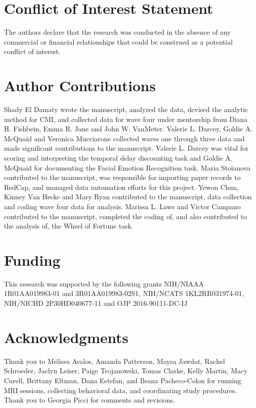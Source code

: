 \documentclass{article}%
\begin{document}
\section*{Conflict of Interest Statement}
The authors declare that the research was conducted in the absence of any commercial or financial relationships that could be construed as a potential conflict of interest.

\section*{Author Contributions}
Shady El Damaty wrote the manuscript, analyzed the data, devised the analytic method for CMI, and collected data for wave four under mentorship from Diana H. Fishbein, Emma R. Jane and John W. VanMeter. Valerie L. Darcey, Goldie A. McQuaid and Veronica Mucciarone collected waves one through three data and made significant contributions to the manuscript. Valerie L. Darcey was vital for scoring and interpreting the temporal delay discounting task and Goldie A. McQuaid for documenting the Facial Emotion Recognition task. Maria Stoianova contributed to the manuscript, was responsible for importing paper records to RedCap, and managed data automation efforts for this project. Yewon Chun, Kinney Van Hecke and Mary Ryan contributed to the manuscript, data collection and coding wave four data for analysis. Marissa L. Laws and Victor Campano contributed to the manuscript, completed the coding of, and also contributed to the analysis of, the Wheel of Fortune task.

\section*{Funding}
This research was supported by the following grants NIH/NIAAA 1R01AA019983-01 and 3R01AA019983-02S1, NIH/NCATS 1KL2RR031974-01, 
NIH/NICHD 2P30HD040677-11 and OJP 2016-90111-DC-IJ


\section*{Acknowledgments}
Thank you to Melissa Avalos, Amanda Patterson, Maysa Jawdat, Rachel Schroeder, Jaclyn Leiser, Paige Trojanowski, Tomas Clarke, Kelly Martin, Macy Curell, Brittany Eltman, Dana Estefan, and Ileana Pacheco-Colon for running MRI sessions, collecting behavioral data, and coordinating study procedures. Thank you to Georgia Picci for comments and revisions.
\end{document}
